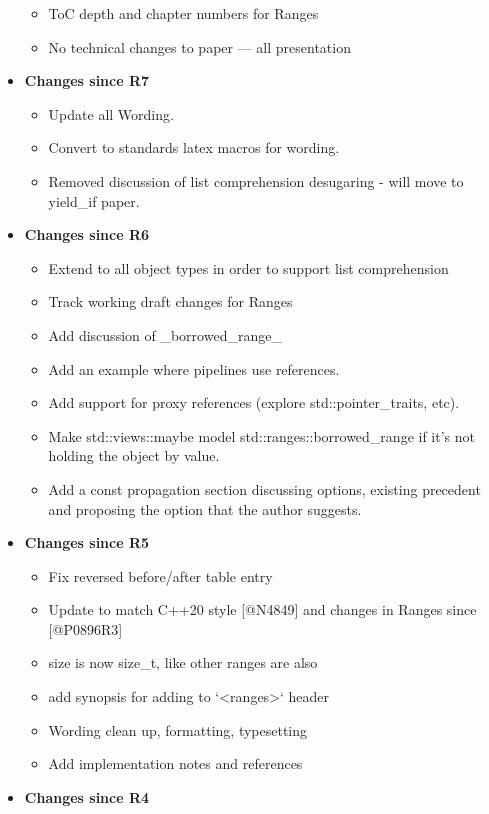 \documentclass[a4paper,10pt,oneside,openany,final,article]{memoir}
\begin{document}
\begin{itemize}
\begin{itemize}
  \item ToC depth and chapter numbers for Ranges
  \item No technical changes to paper --- all presentation
  \end{itemize}
\item \textbf{Changes since R7}
  \begin{itemize}
  \item Update all Wording.
  \item Convert to standards latex macros for wording.
  \item Removed discussion of list comprehension desugaring - will move to yield_if paper.
  \end{itemize}
\item \textbf{Changes since R6}
  \begin{itemize}
  \item Extend to all object types in order to support list comprehension
  \item Track working draft changes for Ranges
  \item Add discussion of _borrowed_range_
  \item Add an example where pipelines use references.
  \item Add support for proxy references (explore std::pointer_traits, etc).
  \item Make std::views::maybe model std::ranges::borrowed_range if it's not holding the object by value.
  \item Add a const propagation section discussing options, existing precedent and proposing the option that the author suggests.
  \end{itemize}
\item \textbf{Changes since R5}
  \begin{itemize}
  \item Fix reversed before/after table entry
  \item Update to match C++20 style [@N4849] and changes in Ranges since [@P0896R3]
  \item size is now size_t, like other ranges are also
  \item add synopsis for adding to `<ranges>` header
  \item Wording clean up, formatting, typesetting
  \item Add implementation notes and references
  \end{itemize}
\item \textbf{Changes since R4}
  \begin{itemize}

\end{itemize}
\end{itemize}
\end{document}
